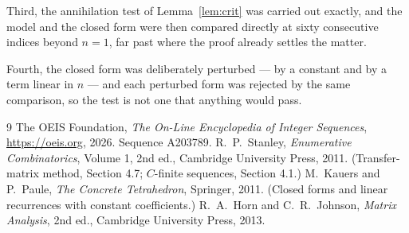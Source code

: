 \documentclass[11pt,a4paper]{article}
\theoremstyle{plain}
\theoremstyle{definition}
\begin{document}
Third, the annihilation test of Lemma~\ref{lem:crit} was carried out exactly, and the model
and the closed form were then compared directly at sixty consecutive indices beyond
$n=1$, far past where the proof already settles the matter.

Fourth, the closed form was deliberately perturbed --- by a constant and by a term linear in
$n$ --- and each perturbed form was rejected by the same comparison, so the test is not one
that anything would pass.

\begin{thebibliography}{9}
 The OEIS Foundation, \emph{The On-Line Encyclopedia of Integer
Sequences}, \url{https://oeis.org}, 2026. Sequence A203789.
 R.~P.~Stanley, \emph{Enumerative Combinatorics}, Volume 1, 2nd ed.,
Cambridge University Press, 2011. (Transfer-matrix method, Section 4.7; $C$-finite sequences,
Section 4.1.)
 M.~Kauers and P.~Paule, \emph{The Concrete Tetrahedron}, Springer, 2011.
(Closed forms and linear recurrences with constant coefficients.)
 R.~A.~Horn and C.~R.~Johnson, \emph{Matrix Analysis}, 2nd ed., Cambridge
University Press, 2013.
\end{thebibliography}
\end{document}
